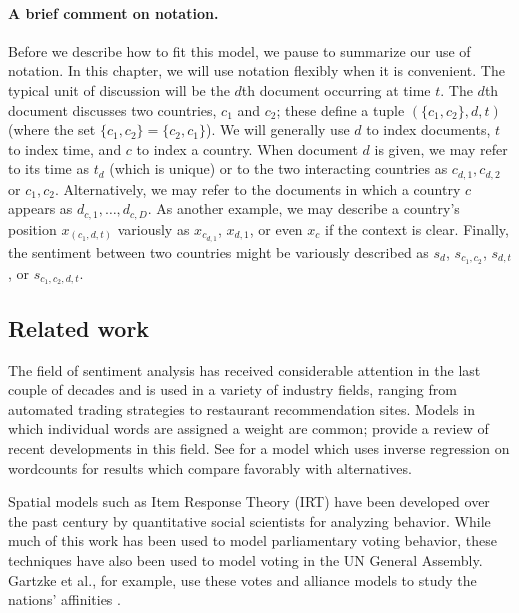 \paragraph{A brief comment on notation.} Before we describe how to fit
this model, we pause to summarize our use of notation.  In this
chapter, we will use notation flexibly when it is convenient.  The
typical unit of discussion will be the $d$th document occurring at
time $t$.  The $d$th document discusses two countries, $c_1$ and
$c_2$; these define a tuple $(\{ c_1, c_2 \}, d, t)$ (where the set
$\{ c_1, c_2 \} = \{ c_2, c_1 \}$).  We will generally use $d$ to
index documents, $t$ to index time, and $c$ to index a country.  When
document $d$ is given, we may refer to its time as $t_d$ (which is
unique) or to the two interacting countries as $c_{d,1},c_{d,2}$ or
$c_1,c_2$.  Alternatively, we may refer to the documents in which a
country $c$ appears as $d_{c,1}, \ldots, d_{c,D}$.  As another
example, we may describe a country's position $x_{(c_1,d,t)}$
variously as $x_{c_{d,1}}$, $x_{d,1}$, or even $x_c$ if the context is
clear. Finally, the sentiment between two countries might be variously
described as $s_d$, $s_{c_1,c_2}$, $s_{d,t}$, or $s_{c_1,c_2,d,t}$.

\subsection{Related work}

The field of sentiment analysis has received considerable attention in
the last couple of decades and is used in a variety of industry
fields, ranging from automated trading strategies to restaurant
recommendation sites.  Models in which individual words are assigned a
weight are common; \cite{pang:2008} provide a review of recent
developments in this field.  See \cite{taddy:2012} for a model which
uses inverse regression on wordcounts for results which compare
favorably with alternatives.

Spatial models such as Item Response Theory (IRT) have been developed
over the past century by quantitative social scientists for analyzing
behavior.  While much of this work has been used to model
parliamentary voting behavior, these techniques have also been used to
model voting in the UN General Assembly. Gartzke et al., for example,
use these votes and alliance models to study the nations' affinities
\citep{gartzke:1998}.

